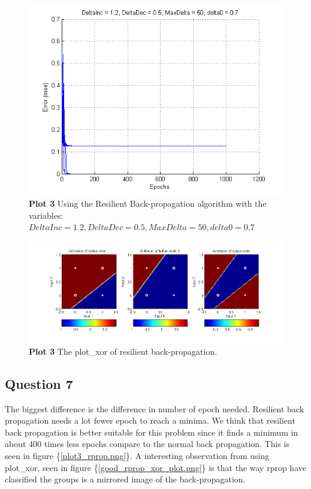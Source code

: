 \documentclass[a4paper]{article}
\begin{document}
\begin{figure}[h!] %
	\caption{\label{fig:plot3_rprop}\textbf{Plot 3} Using the Resilient Back-propagation algorithm with the variables: $DeltaInc = 1.2, DeltaDec = 0.5, MaxDelta = 50, delta0 = 0.7$}
	\includegraphics[]{plot3_rprop.png}
\end{figure}
\begin{figure}[h!] %
	\caption{\label{fig:good_rprop_xor_plot}\textbf{Plot 3} The plot\_xor of resilient back-propagation.}
	\includegraphics[scale=0.55]{good_rprop_xor_plot.png}
\end{figure}
\subsection*{Question 7}
The biggest difference is the difference in number of epoch needed. Resilient back propagation needs a lot fewer epoch to reach a minima.
We think that resilient back propagation is better suitable for this problem since it finds a minimum in about 400 times less epochs compare to the normal back propagation. This is seen in figure \{\ref{plot3_rprop.png}\}.
A interesting observation from using plot\_xor, seen in figure \{\ref{good_rprop_xor_plot.png}\} is that the way rprop have classified the groups is a mirrored image of the back-propagation. 
\end{document}
